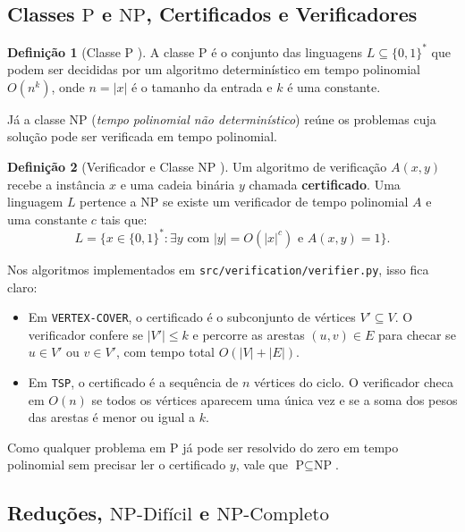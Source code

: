 \documentclass[conference]{IEEEtran}
\theoremstyle{definition}
\newtheorem{definicao}{Definição}
\theoremstyle{plain}
\begin{document}
\subsection{Classes $\text{P}$ e $\text{NP}$, Certificados e Verificadores}

\begin{definicao}[Classe $\text{P}$ \cite{cormen2012algoritmos}]
A classe $\text{P}$ é o conjunto das linguagens $L \subseteq \{0,1\}^*$ que podem ser decididas por um algoritmo determinístico em tempo polinomial $O(n^k)$, onde $n = |x|$ é o tamanho da entrada e $k$ é uma constante.
\end{definicao}

Já a classe $\text{NP}$ (\textit{tempo polinomial não determinístico}) reúne os problemas cuja solução pode ser verificada em tempo polinomial.

\begin{definicao}[Verificador e Classe $\text{NP}$ \cite{cormen2012algoritmos}]
Um algoritmo de verificação $A(x, y)$ recebe a instância $x$ e uma cadeia binária $y$ chamada \textbf{certificado}. Uma linguagem $L$ pertence a $\text{NP}$ se existe um verificador de tempo polinomial $A$ e uma constante $c$ tais que:
\begin{equation}
L = \{ x \in \{0,1\}^* : \exists y \text{ com } |y| = O(|x|^c) \text{ e } A(x, y) = 1 \}.
\label{eq:def_np}
\end{equation}
\end{definicao}

Nos algoritmos implementados em \texttt{src/verification/verifier.py}, isso fica claro:
\begin{itemize}
    \item Em \texttt{VERTEX-COVER}, o certificado é o subconjunto de vértices $V' \subseteq V$. O verificador confere se $|V'| \le k$ e percorre as arestas $(u, v) \in E$ para checar se $u \in V'$ ou $v \in V'$, com tempo total $O(|V| + |E|)$.
    \item Em \texttt{TSP}, o certificado é a sequência de $n$ vértices do ciclo. O verificador checa em $O(n)$ se todos os vértices aparecem uma única vez e se a soma dos pesos das arestas é menor ou igual a $k$.
\end{itemize}

Como qualquer problema em $\text{P}$ já pode ser resolvido do zero em tempo polinomial sem precisar ler o certificado $y$, vale que $\text{P} \subseteq \text{NP}$.

\subsection{Reduções, $\text{NP-Difícil}$ e $\text{NP-Completo}$}
\end{document}
